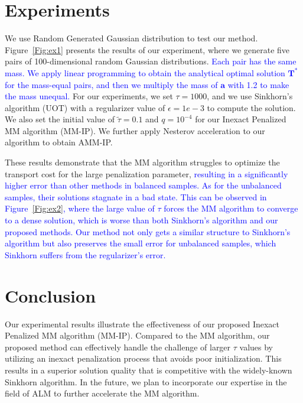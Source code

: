 \documentclass[a4paper,twocolumn]{article}
\newcommand{\mat}[1]{\mathbf{#1}}
\renewcommand{\vec}[1]{\bm{#1}}
\newcommand{\changeSX}[1]{\textcolor{blue}{#1}}
\begin{document}
\section{Experiments}
We use Random Generated Gaussian distribution to test our method. Figure~\ref{Fig:ex1} presents the results of our experiment, where we generate five pairs of 100-dimensional random Gaussian distributions. \changeSX{ Each pair has the same mass. We apply linear programming to obtain the analytical optimal solution $\mat T^{*}$ for the mass-equal pairs, and then we multiply the mass of $\vec a$ with 1.2 to make the mass unequal. }For our experiments, we set $\tau = 1000$, and we use Sinkhorn's algorithm (UOT) with a regularizer value of $\epsilon = 1e-3$ to compute the solution. We also set the initial value of $\tilde{\tau} = 0.1$ and $q = 10^{-4}$ for our Inexact Penalized MM algorithm (MM-IP). We further apply Nesterov acceleration to our algorithm to obtain AMM-IP.

These results demonstrate that the MM algorithm struggles to optimize the transport cost for the large penalization parameter,\changeSX{ resulting in a significantly higher error than other methods in balanced samples. As for the unbalanced samples, their solutions stagnate in a bad state. This can be observed in Figure~\ref{Fig:ex2}, where the large value of $\tau$ forces the MM algorithm to converge to a dense solution, which is worse than both Sinkhorn's algorithm and our proposed methods. Our method not only gets a similar structure to Sinkhorn's algorithm but also preserves the small error for unbalanced samples, which Sinkhorn suffers from the regularizer's error.}

\section{Conclusion}
Our experimental results illustrate the effectiveness of our proposed Inexact Penalized MM algorithm (MM-IP). Compared to the MM algorithm, our proposed method can effectively handle the challenge of larger $\tau$ values by utilizing an inexact penalization process that avoids poor initialization. This results in a superior solution quality that is competitive with the widely-known Sinkhorn algorithm. In the future, we plan to incorporate our expertise in the field of ALM to further accelerate the MM algorithm.




\end{document}
